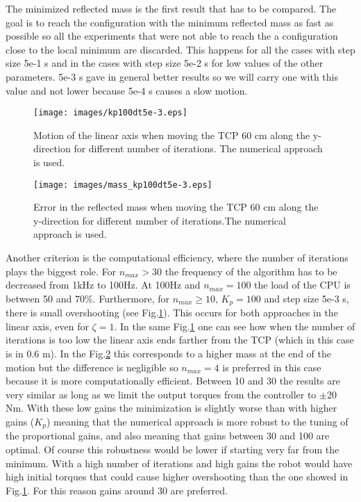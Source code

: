 The minimized reflected mass is the first result that has to be compared. The goal is to reach the configuration with the minimum reflected mass as fast as possible so all the experiments that were not able to reach the a configuration close to the local minimum are discarded. This happens for all the cases with step size 5e-1 s and in the cases with step size  5e-2 s for low values of the other parameters. 5e-3 s gave in general better results so we will carry one with this value and not lower because 5e-4 s causes a  slow motion.
\begin{figure}[!htb]
	\centerline{
		\texttt{[image: images/kp100dt5e-3.eps]}}
	\caption{Motion of the linear axis when moving the TCP 60 cm along the y-direction for different number of iterations. The numerical approach is used.}
	\label{fig:kp100dt5e-3}
\end{figure}

\begin{figure}[!htb]
	\centerline{
		\texttt{[image: images/mass\_kp100dt5e-3.eps]}}
	\caption{Error in the reflected mass when moving the TCP 60 cm along the y-direction for different number of iterations.The numerical approach is used.}
	\label{fig:mass_kp100dt5e-3}
\end{figure}

Another criterion is the computational efficiency, where the number of iterations plays the biggest role. For $n_{max} > 30$ the frequency of the algorithm has to be decreased from 1kHz to 100Hz. At 100Hz and $n_{max} = 100$ the load of the CPU is between 50 and 70\%. Furthermore, for  $n_{max} \ge 10$,  $K_p=100$ and step size 5e-3 s,  there is small overshooting (see Fig.\ref{fig:kp100dt5e-3}). This occurs for both approaches in the linear axis, even for $\zeta = 1$. In the same Fig.\ref{fig:kp100dt5e-3} one can see how when the number of iterations is too low the linear axis ends farther from the TCP (which in this case is in 0.6 m). In the Fig.\ref{fig:mass_kp100dt5e-3} this corresponds to a higher mass at the end of the motion but the difference is negligible so $n_{max} = 4$ is preferred in this case because it is more computationally efficient. 
Between 10 and 30 the results are very similar as long as we limit the output torques from the controller to $\pm$20 Nm. With these low gains the minimization is slightly worse than with higher gains ($K_p$) meaning that the numerical approach is more robust to the tuning of the proportional gains, and also meaning that gains between 30 and 100 are optimal.
Of course this robustness would be lower if starting very far from the minimum. With a high number of iterations and high gains the robot would have high initial torques that could cause higher overshooting than the one showed in Fig.\ref{fig:kp100dt5e-3}. For this reason gains around 30 are preferred. 

